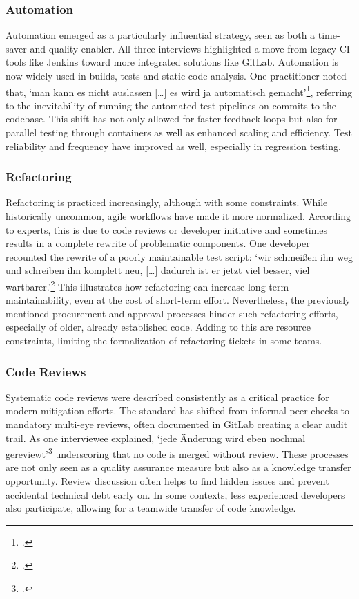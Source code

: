 \subsubsection{Automation}
Automation emerged as a particularly influential strategy, seen as both a time-saver and quality enabler. All three interviews highlighted a move from legacy CI tools like Jenkins toward more integrated solutions like GitLab. Automation is now widely used in builds, tests and static code analysis.
One practitioner noted that, `man kann es nicht auslassen [\ldots] es wird ja automatisch gemacht'\footcite{Interview22025}, referring to the inevitability of running the automated test pipelines on commits to the codebase. This shift has not only allowed for faster feedback loops but also for parallel testing through
containers as well as enhanced scaling and efficiency. Test reliability and frequency have improved as well, especially in regression testing.\\

\subsubsection{Refactoring}
Refactoring is practiced increasingly, although with some constraints. While historically uncommon, agile workflows have made it more normalized. According to experts, this is due to code reviews or developer initiative and sometimes results in a complete rewrite of problematic components.
One developer recounted the rewrite of a poorly maintainable test script: `wir schmeißen ihn weg und schreiben ihn komplett neu, [\ldots] dadurch ist er jetzt viel besser, viel wartbarer.'\footcite{Interview22025} This illustrates how refactoring can increase long-term maintainability, even at the cost of short-term effort.
Nevertheless, the previously mentioned procurement and approval processes hinder such refactoring efforts, especially of older, already established code. Adding to this are resource constraints, limiting the formalization of refactoring tickets in some teams.\\

\subsubsection{Code Reviews}
Systematic code reviews were described consistently as a critical practice for modern mitigation efforts. The standard has shifted from informal peer checks to mandatory multi-eye reviews, often documented in GitLab creating a clear audit trail. As one interviewee explained, `jede Änderung wird eben nochmal gereviewt'\footcite{Interview22025}
underscoring that no code is merged without review. These processes are not only seen as a quality assurance measure but also as a knowledge transfer opportunity. Review discussion often helps to find hidden issues and prevent accidental technical debt early on. In some contexts,
less experienced developers also participate, allowing for a teamwide transfer of code knowledge.\\

